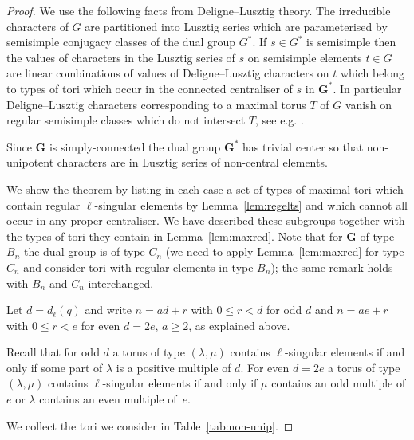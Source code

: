 \documentclass{ert-l}
\newcommand{\bG}{{\mathbf{G}}}
\let\la=\lambda
\theoremstyle{definition}
\theoremstyle{remark}
\begin{document}
\begin{proof}
We use the following facts from Deligne--Lusztig theory. The irreducible
characters of $G$ are partitioned into Lusztig series which are parameterised
by semisimple conjugacy classes of the dual group $G^*$.
If $s \in G^*$ is semisimple then the values of characters in the Lusztig
series of $s$ on semisimple elements $t \in G$ are linear combinations of
values of Deligne--Lusztig characters on $t$ which belong to types of tori
which occur in the connected centraliser of $s$ in $\bG^*$. In particular
Deligne--Lusztig characters corresponding to a maximal torus $T$ of $G$
vanish on regular semisimple classes which do not intersect $T$, see e.g.
\cite[Prop.~6.4]{LMS13}.

Since $\bG$ is simply-connected the dual group $\bG^*$ has trivial center
so that non-unipotent characters are in Lusztig series of non-central
elements.

We show the theorem by listing in each case a set of types of maximal tori
which contain regular $\ell$-singular elements  by Lemma~\ref{lem:regelts} and
which cannot all occur in any proper centraliser. We have described
these subgroups together with the types of tori they contain in
Lemma~\ref{lem:maxred}. Note that for $\bG$ of type $B_n$ the dual group is
of type $C_n$ (we need to apply Lemma~\ref{lem:maxred} for type $C_n$ and
consider tori with regular elements in type $B_n$); the same remark holds
with $B_n$ and $C_n$ interchanged.

Let $d=d_\ell(q)$ and write $n = ad+r$ with $0 \leq r < d$ for odd $d$ and
$n = ae+r$ with $0 \leq r < e$ for even $d=2e$, $a\geq 2$, as explained above.

Recall that for odd $d$ a torus of type $(\la,\mu)$ contains $\ell$-singular
elements if and only if some part of $\la$ is a positive multiple of $d$.
For even $d=2e$ a torus of type $(\la,\mu)$ contains $\ell$-singular elements
if and only if $\mu$ contains an odd multiple of $e$ or $\la$ contains an
even multiple of~$e$.

We collect the tori we consider in Table~\ref{tab:non-unip}.


\end{proof}
\end{document}
